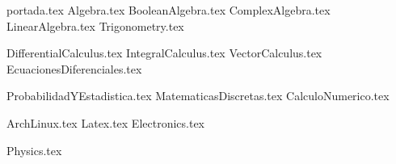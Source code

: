 
{portada.tex}
\newpage
\tableofcontents
\printindex
\newpage
{Algebra.tex}
{BooleanAlgebra.tex}
{ComplexAlgebra.tex}
{LinearAlgebra.tex}
{Trigonometry.tex}  %

{DifferentialCalculus.tex}  %
{IntegralCalculus.tex}  %
{VectorCalculus.tex}
{EcuacionesDiferenciales.tex}

{ProbabilidadYEstadistica.tex}
{MatematicasDiscretas.tex}
{CalculoNumerico.tex}

{ArchLinux.tex}
{Latex.tex}
{Electronics.tex}

{Physics.tex}
